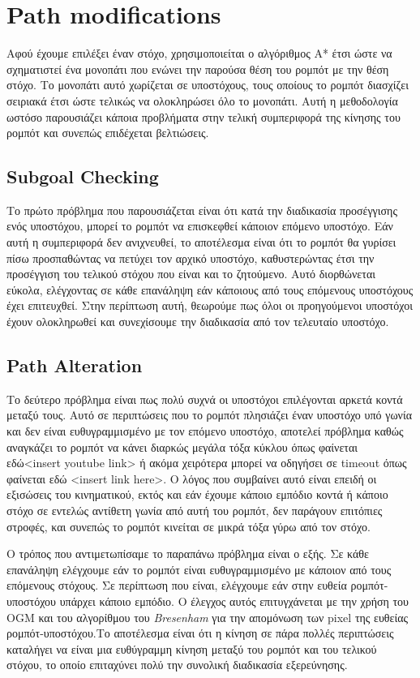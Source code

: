 \section*{Path modifications}
Αφού έχουμε επιλέξει έναν στόχο, χρησιμοποιείται ο αλγόριθμος A* έτσι ώστε να σχηματιστεί ένα μονοπάτι που ενώνει την παρούσα θέση του ρομπότ με την θέση στόχο. Το μονοπάτι αυτό χωρίζεται σε υποστόχους, τους οποίους το ρομπότ διασχίζει σειριακά έτσι ώστε τελικώς να ολοκληρώσει όλο το μονοπάτι. Αυτή η μεθοδολογία ωστόσο παρουσιάζει κάποια προβλήματα στην τελική συμπεριφορά της κίνησης του ρομπότ και συνεπώς επιδέχεται βελτιώσεις.

\subsection*{Subgoal Checking}

Το πρώτο πρόβλημα που παρουσιάζεται είναι ότι κατά την διαδικασία προσέγγισης ενός υποστόχου, μπορεί το ρομπότ να επισκεφθεί κάποιον επόμενο υποστόχο. Εάν αυτή η συμπεριφορά δεν ανιχνευθεί, το αποτέλεσμα είναι ότι το ρομπότ θα γυρίσει πίσω προσπαθώντας να πετύχει τον αρχικό υποστόχο, καθυστερώντας έτσι την προσέγγιση του τελικού στόχου που είναι και το ζητούμενο. Αυτό διορθώνεται εύκολα, ελέγχοντας σε κάθε επανάληψη εάν κάποιους από τους επόμενους υποστόχους έχει επιτευχθεί. Στην περίπτωση αυτή, θεωρούμε πως όλοι οι προηγούμενοι υποστόχοι έχουν ολοκληρωθεί και συνεχίσουμε την διαδικασία από τον τελευταίο υποστόχο.

\subsection*{Path Alteration}

Το δεύτερο πρόβλημα είναι πως πολύ συχνά οι υποστόχοι επιλέγονται αρκετά κοντά μεταξύ τους. Αυτό σε περιπτώσεις που το ρομπότ πλησιάζει έναν υποστόχο υπό γωνία και δεν είναι ευθυγραμμισμένο με τον επόμενο υποστόχο, αποτελεί πρόβλημα καθώς αναγκάζει το ρομπότ να κάνει διαρκώς μεγάλα τόξα κύκλου όπως φαίνεται εδώ<insert youtube link> ή ακόμα χειρότερα μπορεί να οδηγήσει σε timeout όπως φαίνεται εδώ <insert link here>. Ο λόγος που συμβαίνει αυτό είναι επειδή οι εξισώσεις του κινηματικού, εκτός και εάν έχουμε κάποιο εμπόδιο κοντά ή κάποιο στόχο σε εντελώς αντίθετη γωνία από αυτή του ρομπότ, δεν παράγουν επιτόπιες στροφές, και συνεπώς το ρομπότ κινείται σε μικρά τόξα γύρω από τον στόχο.

Ο τρόπος που αντιμετωπίσαμε το παραπάνω πρόβλημα είναι ο εξής. Σε κάθε επανάληψη ελέγχουμε εάν το ρομπότ είναι ευθυγραμμισμένο με κάποιον από τους επόμενους στόχους. Σε περίπτωση που είναι, ελέγχουμε εάν στην ευθεία ρομπότ-υποστόχου υπάρχει κάποιο εμπόδιο. Ο έλεγχος αυτός επιτυγχάνεται με την χρήση του OGM και του αλγορίθμου του \emph{Bresenham} για την απομόνωση των pixel της ευθείας ρομπότ-υποστόχου.Το αποτέλεσμα είναι ότι η κίνηση σε πάρα πολλές περιπτώσεις καταλήγει να είναι μια ευθύγραμμη κίνηση μεταξύ του ρομπότ και του τελικού στόχου, το οποίο επιταχύνει πολύ την συνολική διαδικασία εξερεύνησης.

